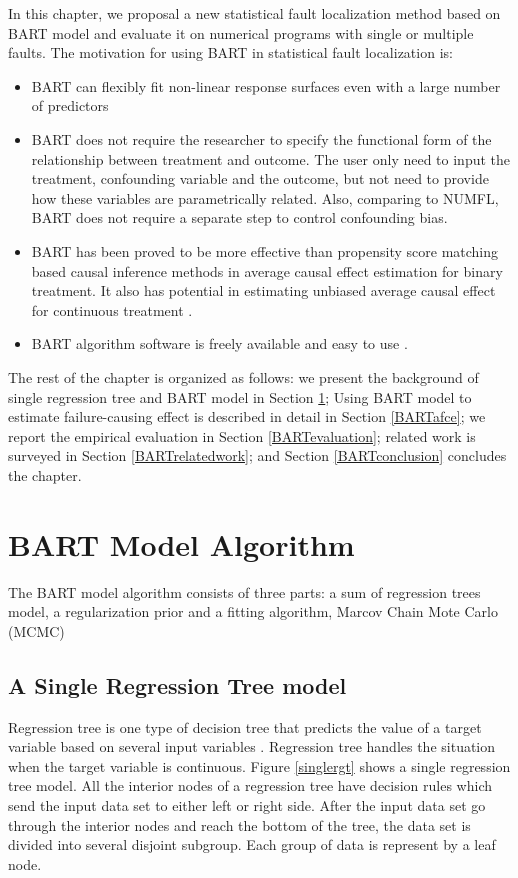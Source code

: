 In this chapter, we proposal a new statistical fault localization method based on BART model and evaluate it on numerical programs with single or multiple faults. The motivation for using BART in statistical fault localization is:
\vspace{-0.2cm}
\begin{itemize}
\item BART can flexibly fit non-linear response surfaces even with a large number of predictors
\item BART does not require the researcher to specify the functional form of the relationship between treatment and outcome. The user only need to input the treatment, confounding variable and the outcome, but not need to provide how these variables are parametrically related. Also, comparing to NUMFL, BART does not require a separate step to control confounding bias.
\item BART has been proved to be more effective than propensity score matching based causal inference methods in average causal effect estimation for binary treatment. It also has potential in estimating unbiased average causal effect for continuous treatment \cite{hill2012bayesian, hill2013assessing}.
\item BART algorithm software is freely available and easy to use \cite{BARTMachine}.
\end{itemize}

The rest of the chapter is organized as follows: we present the background of single regression tree and BART model in Section \ref{BARTbg}; Using BART model to estimate failure-causing effect is described in detail in Section \ref{BARTafce};  we report the empirical evaluation in Section \ref{BARTevaluation}; related work is surveyed in Section \ref{BARTrelatedwork}; and Section \ref{BARTconclusion} concludes the chapter.

\section{BART Model Algorithm}\label{BARTbg}%
The BART model algorithm consists of three parts: a sum of regression trees model, a regularization prior and a fitting algorithm, Marcov Chain Mote Carlo (MCMC)
\subsection{A Single Regression Tree model}
Regression tree is one type of decision tree that predicts the value of a target variable based on several input variables \cite{loh2011classification}. Regression tree handles the situation when the target variable is continuous. Figure \ref{singlergt} shows a single regression tree model. All the interior nodes of a regression tree have decision rules which send the input data set to either left or right side. After the input data set go through the interior nodes and reach the bottom of the tree, the data set is divided into several disjoint subgroup. Each group of data is represent by a leaf node.

